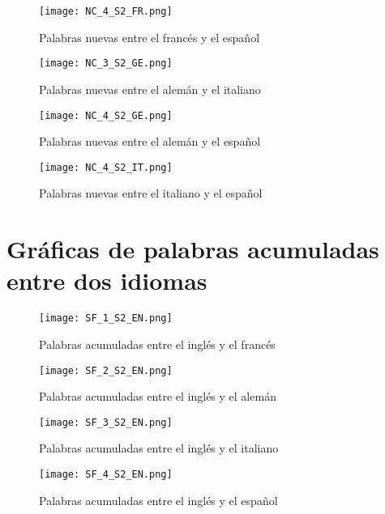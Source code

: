 \begin{figure}[h!]
	\centering
	\texttt{[image: NC\_4\_S2\_FR.png]}
	\label{fig.NC_FS}
	\caption{Palabras nuevas entre el francés y el español}
\end{figure}

\begin{figure}[h!]
	\centering
	\texttt{[image: NC\_3\_S2\_GE.png]}
	\label{fig.NC_GI}
	\caption{Palabras nuevas entre el alemán y el italiano}
\end{figure}

\begin{figure}[h!]
	\centering
	\texttt{[image: NC\_4\_S2\_GE.png]}
	\label{fig.NC_GS}
	\caption{Palabras nuevas entre el alemán y el español}
\end{figure}

\begin{figure}[h!]
	\centering
	\texttt{[image: NC\_4\_S2\_IT.png]}
	\label{fig.NC_IS}
	\caption{Palabras nuevas entre el italiano y el español}
\end{figure}





\clearpage



\section{Gráficas de palabras acumuladas entre dos idiomas}
\label{palabras.acumuladas.apendice}

\begin{figure}[h!]
	\centering
	\texttt{[image: SF\_1\_S2\_EN.png]}
	\label{fig.SF_EF}
	\caption{Palabras acumuladas entre el inglés y el francés}
\end{figure}


\begin{figure}[h!]
	\centering
	\texttt{[image: SF\_2\_S2\_EN.png]}
	\label{fig.SF_EG}
	\caption{Palabras acumuladas entre el inglés y el alemán}
\end{figure}


\begin{figure}[h!]
	\centering
	\texttt{[image: SF\_3\_S2\_EN.png]}
	\label{fig.SF_EI}
	\caption{Palabras acumuladas entre el inglés y el italiano}
\end{figure}

\begin{figure}[h!]
	\centering
	\texttt{[image: SF\_4\_S2\_EN.png]}
	\label{fig.SF_ES}
	\caption{Palabras acumuladas entre el inglés y el español}
\end{figure}


